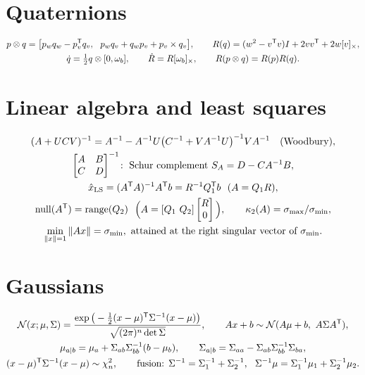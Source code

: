 \section*{Quaternions}
\begin{gather*}
  p\otimes q = \big[p_wq_w - p_v^{\mathsf{T}} q_v,\ \ p_wq_v + q_wp_v + p_v\times q_v\big], \qquad
  R(q) = (w^2 - v^{\mathsf{T}} v)I + 2vv^{\mathsf{T}} + 2w[v]_{\times}, \\
  \dot q = \tfrac12 q\otimes[0, \omega_b], \qquad \dot R = R[\omega_b]_{\times}, \qquad R(p\otimes q) = R(p)R(q).
\end{gather*}

\section*{Linear algebra and least squares}
\begin{gather*}
  (A + UCV)\inv = A\inv - A\inv U\big(C\inv + VA\inv U\big)\inv VA\inv \quad \text{(Woodbury)}, \\
  \begin{bmatrix} A & B \\ C & D\end{bmatrix}\inv\!: \ \text{Schur complement } S_A = D - CA\inv B, \\
  \hat x_{\mathrm{LS}} = (A\T A)\inv A\T b = R\inv Q_1\T b \ \ (A = Q_1R), \\
  \nullsp(A\T) = \range(Q_2) \ \ \Big(A = [Q_1\ Q_2]\begin{bmatrix} R \\ 0\end{bmatrix}\Big), \qquad
  \kappa_2(A) = \sigma_{\max}/\sigma_{\min}, \\
  \min_{\|x\| = 1}\|Ax\| = \sigma_{\min}, \text{ attained at the right singular vector of } \sigma_{\min} .
\end{gather*}

\section*{Gaussians}
\begin{gather*}
  \N(x; \mu, \Sigma) = \frac{\exp\big(-\tfrac12(x - \mu)\T\Sigma\inv(x - \mu)\big)}{\sqrt{(2\pi)^n\det\Sigma}}, \qquad
  Ax + b \sim \N(A\mu + b,\ A\Sigma A\T), \\
  \mu_{a|b} = \mu_a + \Sigma_{ab}\Sigma_{bb}\inv(b - \mu_b), \qquad \Sigma_{a|b} = \Sigma_{aa} - \Sigma_{ab}\Sigma_{bb}\inv\Sigma_{ba}, \\
  (x - \mu)\T\Sigma\inv(x - \mu) \sim \chi^2_n, \qquad
  \text{fusion: } \Sigma\inv = \Sigma_1\inv + \Sigma_2\inv,\ \ \Sigma\inv\mu = \Sigma_1\inv\mu_1 + \Sigma_2\inv\mu_2 .
\end{gather*}

